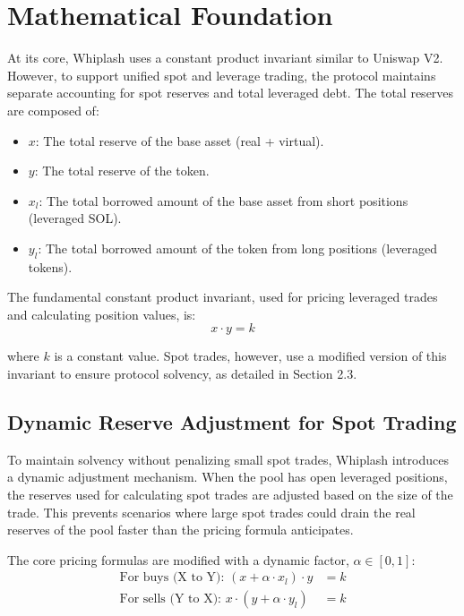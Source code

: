 \documentclass[11pt]{article}
\begin{document}
\section{Mathematical Foundation}

At its core, Whiplash uses a constant product invariant similar to Uniswap V2. However, to support unified spot and leverage trading, the protocol maintains separate accounting for spot reserves and total leveraged debt. The total reserves are composed of:
\begin{itemize}
    \item $x$: The total reserve of the base asset (real + virtual).
    \item $y$: The total reserve of the token.
    \item $x_l$: The total borrowed amount of the base asset from short positions (leveraged SOL).
    \item $y_l$: The total borrowed amount of the token from long positions (leveraged tokens).
\end{itemize}

The fundamental constant product invariant, used for pricing leveraged trades and calculating position values, is:
\begin{equation}
x \cdot y = k
\end{equation}

where $k$ is a constant value. Spot trades, however, use a modified version of this invariant to ensure protocol solvency, as detailed in Section 2.3.

\subsection{Dynamic Reserve Adjustment for Spot Trading}

To maintain solvency without penalizing small spot trades, Whiplash introduces a dynamic adjustment mechanism. When the pool has open leveraged positions, the reserves used for calculating spot trades are adjusted based on the size of the trade. This prevents scenarios where large spot trades could drain the real reserves of the pool faster than the pricing formula anticipates.

The core pricing formulas are modified with a dynamic factor, $\alpha \in [0, 1]$:
\begin{align}
\text{For buys (X to Y): } (x + \alpha \cdot x_l) \cdot y &= k \\
\text{For sells (Y to X): } x \cdot (y + \alpha \cdot y_l) &= k
\end{align}
\end{document}

